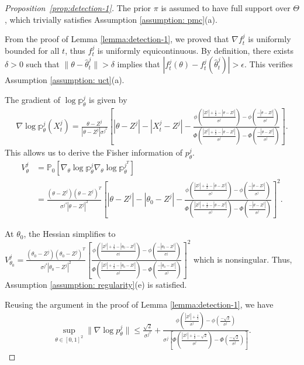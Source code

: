 \documentclass[twoside,11pt]{article}
\numberwithin{equation}{section}
\newcommand\bP{\mathbb{P}}
\newcommand\bp{\mathbb{p}}
\begin{document}
{\begin{proof}[Proposition~\ref{prop:detection-1}]
The prior $\pi$ is assumed to have full support over $\Theta$, which trivially satisfies Assumption \ref{assumption: pmc}(a).

From the proof of Lemma \ref{lemma:detection-1}, we proved that $\nabla f_t^j$ is uniformly bounded for all $t$, thus $f_t^j$ is uniformly equicontinuous. By definition, there exists $\delta > 0$ such that $\|\theta - \hat \theta_t^j\| > \delta$ implies that $|f_t^j(\theta) - f_t^j(\hat \theta_t^j)| > \epsilon$. This verifies Assumption \ref{assumption: uct}(a). 

The gradient of $\log \bp_\theta^j$ is given by
\begin{align*}
    \nabla \log \bp_\theta^j(X_t^j) = \frac{\theta - Z^j}{|\theta - Z^j| \sigma^{j^2}} \left[ |\theta - Z^j| - |X_t^j - Z^j| - \frac{\phi\left(\frac{|Z^j| + \frac{1}{2} - |\theta - Z^j|}{\sigma^j}\right) - \phi\left(\frac{- |\theta - Z^j|}{\sigma^j}\right)}{\Phi\left(\frac{|Z^j| + \frac{1}{2} - |\theta - Z^j|}{\sigma^j}\right) - \Phi\left(\frac{- |\theta - Z^j|}{\sigma^j}\right)} \right].
\end{align*}
This allows us to derive the Fisher information of $p_\theta^j$. 
\begin{align*}
   V_\theta^j &=  \bP_0[\nabla_\theta \log \bp_\theta^j \nabla_\theta \log \bp_\theta^{j^T}] \\
   &=  \frac{(\theta - Z^j) (\theta - Z^j)^T}{\sigma^{j^4} |\theta - Z^j|^2} \left[ |\theta - Z^j| - |\theta_0 - Z^j| - \frac{\phi(\frac{|Z^j|+ \frac{1}{2} - |\theta - Z^j|}{\sigma^j}) - \phi(\frac{- |\theta - Z^j|}{\sigma^j})}{ \Phi(\frac{|Z^j|+ \frac{1}{2} - |\theta - Z^j|}{\sigma^j}) - \Phi(\frac{- |\theta - Z^j|}{\sigma^j}) } \right]^2. 
\end{align*}

At $\theta_0$, the Hessian simplifies to $V_{\theta_0}^j = \frac{(\theta_0 - Z^j) (\theta_0 - Z^j)^T}{\sigma^{j^4} |\theta_0 - Z^j|^2} \left[ \frac{\phi(\frac{|Z^j|+ \frac{1}{2} - |\theta_0 - Z^j|}{\sigma^j}) - \phi(\frac{- |\theta_0 - Z^j|}{\sigma^j})}{ \Phi(\frac{|Z^j|+ \frac{1}{2} - |\theta_0 - Z^j|}{\sigma^j}) - \Phi(\frac{- |\theta_0 - Z^j|}{\sigma^j}) } \right]^2$ which is nonsingular. Thus, Assumption \ref{assumption: regularity}(e) is satisfied. 

Reusing the argument in the proof of Lemma \ref{lemma:detection-1}, we have
\begin{align*}
   \sup_{\theta \in [0,1]^2} \|\nabla \log p_{\theta}^j\| \leq \frac{\sqrt{2}}{\sigma^{j^2}} + \frac{\phi(\frac{|Z^j|+ \frac{1}{2}}{\sigma^j}) - \phi(\frac{- \sqrt{2}}{\sigma^j}) }{\sigma^j\left[\Phi(\frac{|Z^j|+ \frac{1}{2} - \sqrt{2}}{\sigma^j}) - \Phi(\frac{- \sqrt{2}}{\sigma^j}) \right]}. 
\end{align*}


\end{proof}}
\end{document}

